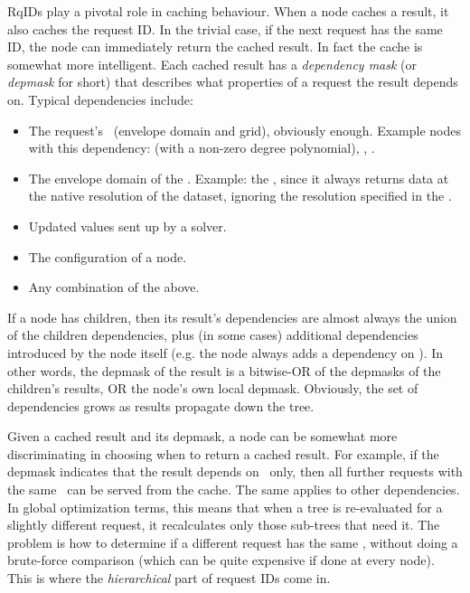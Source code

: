 \documentclass[10pt]{article}
\begin{document}
  RqIDs play a pivotal role in caching behaviour. When a node caches a result,
  it also caches the request ID. In the trivial case, if the next request has
  the same ID, the node can immediately return the cached result. In fact the
  cache is somewhat more intelligent. Each cached result has  a {\em dependency
  mask} (or {\em depmask} for short) that describes what properties of a
  request the result depends on. Typical dependencies include:

  \begin{itemize} 
  
  \item The request's \Cells\ (envelope domain and grid), obviously enough.
  Example nodes with this dependency:  (with a non-zero degree
  polynomial), , . 

  \item The envelope domain of the \Cells. Example: the ,
  since it always returns data at the native resolution of the dataset, ignoring
  the resolution specified in the \Cells.
  
  \item Updated  values sent up by a solver.
  
  \item The configuration of a  node.

  \item Any combination of the above. 

  \end{itemize}
  
  If a node has children, then its result's dependencies are almost always the
  union of the children dependencies, plus (in some cases) additional
  dependencies introduced by the node itself (e.g. the  node always
  adds a dependency on \Cells). In other words, the depmask of the result is 
  a bitwise-OR of the depmasks of the children's results, OR the node's own
  local depmask. Obviously, the set of dependencies grows as results propagate
  down the tree.

  Given a cached result and its depmask, a node can be somewhat more
  discriminating in choosing when to return a cached result. For example, if
  the depmask indicates that the result depends on \Cells\ only, then all
  further requests with the same \Cells\ can be served from the cache. The same
  applies to other dependencies. In global optimization terms, this means that
  when a tree is re-evaluated for a slightly different request, it recalculates
  only those sub-trees that need it. The problem is how to determine if a
  different request has the same \Cells, without doing a brute-force comparison
  (which can be quite expensive if done at every node). This is where the {\em
  hierarchical} part of request IDs come in.
\end{document}
